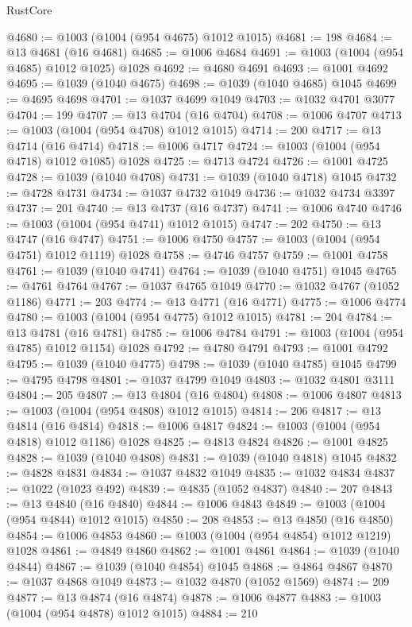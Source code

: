 \begin{lexlean}{RustCore}
\begin{coremodule}
@4680 := @1003 (@1004 (@954 @4675) @1012 @1015)
@4681 := 198
@4684 := @13 @4681 (@16 @4681)
@4685 := @1006 @4684
@4691 := @1003 (@1004 (@954 @4685) @1012 @1025) @1028
@4692 := @4680 @4691
@4693 := @1001 @4692
@4695 := @1039 (@1040 @4675)
@4698 := @1039 (@1040 @4685) @1045
@4699 := @4695 @4698
@4701 := @1037 @4699 @1049
@4703 := @1032 @4701 @3077
@4704 := 199
@4707 := @13 @4704 (@16 @4704)
@4708 := @1006 @4707
@4713 := @1003 (@1004 (@954 @4708) @1012 @1015)
@4714 := 200
@4717 := @13 @4714 (@16 @4714)
@4718 := @1006 @4717
@4724 := @1003 (@1004 (@954 @4718) @1012 @1085) @1028
@4725 := @4713 @4724
@4726 := @1001 @4725
@4728 := @1039 (@1040 @4708)
@4731 := @1039 (@1040 @4718) @1045
@4732 := @4728 @4731
@4734 := @1037 @4732 @1049
@4736 := @1032 @4734 @3397
@4737 := 201
@4740 := @13 @4737 (@16 @4737)
@4741 := @1006 @4740
@4746 := @1003 (@1004 (@954 @4741) @1012 @1015)
@4747 := 202
@4750 := @13 @4747 (@16 @4747)
@4751 := @1006 @4750
@4757 := @1003 (@1004 (@954 @4751) @1012 @1119) @1028
@4758 := @4746 @4757
@4759 := @1001 @4758
@4761 := @1039 (@1040 @4741)
@4764 := @1039 (@1040 @4751) @1045
@4765 := @4761 @4764
@4767 := @1037 @4765 @1049
@4770 := @1032 @4767 (@1052 @1186)
@4771 := 203
@4774 := @13 @4771 (@16 @4771)
@4775 := @1006 @4774
@4780 := @1003 (@1004 (@954 @4775) @1012 @1015)
@4781 := 204
@4784 := @13 @4781 (@16 @4781)
@4785 := @1006 @4784
@4791 := @1003 (@1004 (@954 @4785) @1012 @1154) @1028
@4792 := @4780 @4791
@4793 := @1001 @4792
@4795 := @1039 (@1040 @4775)
@4798 := @1039 (@1040 @4785) @1045
@4799 := @4795 @4798
@4801 := @1037 @4799 @1049
@4803 := @1032 @4801 @3111
@4804 := 205
@4807 := @13 @4804 (@16 @4804)
@4808 := @1006 @4807
@4813 := @1003 (@1004 (@954 @4808) @1012 @1015)
@4814 := 206
@4817 := @13 @4814 (@16 @4814)
@4818 := @1006 @4817
@4824 := @1003 (@1004 (@954 @4818) @1012 @1186) @1028
@4825 := @4813 @4824
@4826 := @1001 @4825
@4828 := @1039 (@1040 @4808)
@4831 := @1039 (@1040 @4818) @1045
@4832 := @4828 @4831
@4834 := @1037 @4832 @1049
@4835 := @1032 @4834
@4837 := @1022 (@1023 @492)
@4839 := @4835 (@1052 @4837)
@4840 := 207
@4843 := @13 @4840 (@16 @4840)
@4844 := @1006 @4843
@4849 := @1003 (@1004 (@954 @4844) @1012 @1015)
@4850 := 208
@4853 := @13 @4850 (@16 @4850)
@4854 := @1006 @4853
@4860 := @1003 (@1004 (@954 @4854) @1012 @1219) @1028
@4861 := @4849 @4860
@4862 := @1001 @4861
@4864 := @1039 (@1040 @4844)
@4867 := @1039 (@1040 @4854) @1045
@4868 := @4864 @4867
@4870 := @1037 @4868 @1049
@4873 := @1032 @4870 (@1052 @1569)
@4874 := 209
@4877 := @13 @4874 (@16 @4874)
@4878 := @1006 @4877
@4883 := @1003 (@1004 (@954 @4878) @1012 @1015)
@4884 := 210

\end{coremodule}
\end{lexlean}
